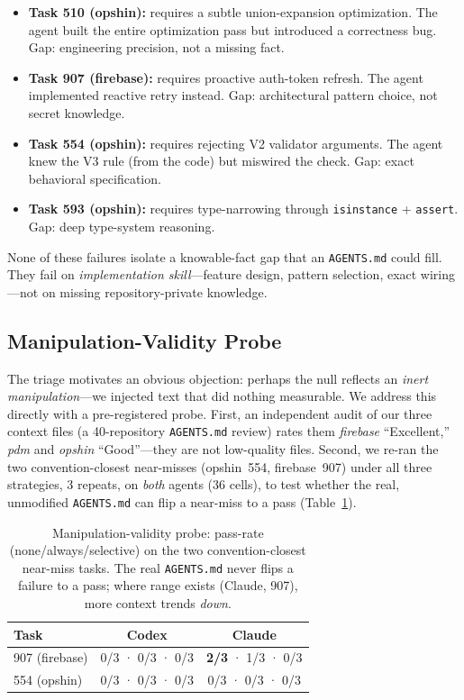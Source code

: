 \documentclass[11pt]{article}
\newcommand{\agentsmd}{\texttt{AGENTS.md}}
\begin{document}
\begin{itemize}
    \item \textbf{Task 510 (opshin):} requires a subtle union-expansion optimization. The agent built the entire optimization pass but introduced a correctness bug. Gap: engineering precision, not a missing fact.
    \item \textbf{Task 907 (firebase):} requires proactive auth-token refresh. The agent implemented reactive retry instead. Gap: architectural pattern choice, not secret knowledge.
    \item \textbf{Task 554 (opshin):} requires rejecting V2 validator arguments. The agent knew the V3 rule (from the code) but miswired the check. Gap: exact behavioral specification.
    \item \textbf{Task 593 (opshin):} requires type-narrowing through \texttt{isinstance} + \texttt{assert}. Gap: deep type-system reasoning.
\end{itemize}

None of these failures isolate a knowable-fact gap that an \agentsmd{} could fill.
They fail on \emph{implementation skill}---feature design, pattern selection, exact wiring---not on missing repository-private knowledge.
\label{sec:triage}

\subsection{Manipulation-Validity Probe}
\label{sec:probe}

The triage motivates an obvious objection: perhaps the null reflects an \emph{inert manipulation}---we injected text that did nothing measurable.
We address this directly with a pre-registered probe.
First, an independent audit of our three context files (a 40-repository \agentsmd{} review) rates them \emph{firebase} ``Excellent,'' \emph{pdm} and \emph{opshin} ``Good''---they are not low-quality files.
Second, we re-ran the two convention-closest near-misses (opshin~554, firebase~907) under all three strategies, 3 repeats, on \emph{both} agents (36 cells), to test whether the real, unmodified \agentsmd{} can flip a near-miss to a pass (Table~\ref{tab:probe}).

\begin{table}[t]
\centering
\small
\caption{Manipulation-validity probe: pass-rate (none/always/selective) on the two convention-closest near-miss tasks. The real \agentsmd{} never flips a failure to a pass; where range exists (Claude, 907), more context trends \emph{down}.}
\label{tab:probe}
\begin{tabular}{lcc}
\toprule
\textbf{Task} & \textbf{Codex} & \textbf{Claude} \\
\midrule
907 (firebase) & 0/3 · 0/3 · 0/3 & \textbf{2/3} · 1/3 · 0/3 \\
554 (opshin)   & 0/3 · 0/3 · 0/3 & 0/3 · 0/3 · 0/3 \\
\bottomrule
\end{tabular}
\end{table}
\end{document}
